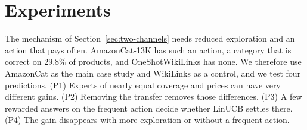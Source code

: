 \documentclass[anon]{alt2027} %
\newif\ifrevmarks\revmarkstrue
\newenvironment{revised}{\ifrevmarks\color{revcolor}\fi}{}
\begin{document}
\section{Experiments}
\label{sec:experiments}

\begin{revised}
The mechanism of Section~\ref{sec:two-channels} needs reduced exploration
and an action that pays often. AmazonCat-13K has such an action, a category
that is correct on $29.8\%$ of products, and OneShotWikiLinks has none. We
therefore use AmazonCat as the main case study and WikiLinks as a control,
and we test four predictions. (P1) Experts of nearly equal coverage and
prices can have very different gains. (P2) Removing the transfer removes
those differences. (P3) A few rewarded answers on the frequent action decide
whether LinUCB settles there. (P4) The gain disappears with more
exploration or without a frequent action.
\end{revised}
\end{document}
